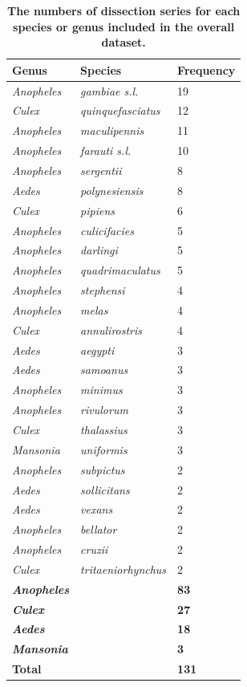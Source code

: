 \documentclass[12pt]{article}
\begin{document}
{\begin{table}[htbp]
	\centering
	\begin{tabular}{lll}
		\toprule
		\textbf{Genus} & \textbf{Species} & \textbf{Frequency} \\
		\midrule
		\textit{Anopheles} & \textit{gambiae s.l.} & 19 \\
		\textit{Culex} & \textit{quinquefasciatus} & 12 \\
		\textit{Anopheles} & \textit{maculipennis} & 11 \\
		\textit{Anopheles} & \textit{farauti s.l.} & 10 \\
		\textit{Anopheles} & \textit{sergentii} & 8 \\
		\textit{Aedes} & \textit{polynesiensis} & 8 \\
		\textit{Culex} & \textit{pipiens} & 6 \\
		\textit{Anopheles} & \textit{culicifacies} & 5 \\
		\textit{Anopheles} & \textit{darlingi} & 5 \\
		\textit{Anopheles} & \textit{quadrimaculatus} & 5 \\
		\textit{Anopheles} & \textit{stephensi} & 4 \\
		\textit{Anopheles} & \textit{melas} & 4 \\
		\textit{Culex} & \textit{annulirostris} & 4 \\
		\textit{Aedes} & \textit{aegypti} & 3 \\
		\textit{Aedes} & \textit{samoanus} & 3 \\
		\textit{Anopheles} & \textit{minimus} & 3 \\
		\textit{Anopheles} & \textit{rivulorum} & 3 \\
		\textit{Culex} & \textit{thalassius} & 3 \\
		\textit{Mansonia} & \textit{uniformis} & 3 \\
		\textit{Anopheles} & \textit{subpictus} & 2 \\
		\textit{Aedes} & \textit{sollicitans} & 2 \\
		\textit{Aedes} & \textit{vexans} & 2 \\
		\textit{Anopheles} & \textit{bellator} & 2 \\
		\textit{Anopheles} & \textit{cruzii} & 2 \\
		\textit{Culex} & \textit{tritaeniorhynchus} & 2 \\
		\bottomrule
		\textit{\textbf{Anopheles}} &       & \textbf{83} \\
		\textit{\textbf{Culex}} &       & \textbf{27} \\
		\textit{\textbf{Aedes}} &       & \textbf{18} \\
		\textit{\textbf{Mansonia}} &       & \textbf{3} \\
		\bottomrule
		\textbf{Total} &  & \textbf{131} \\
	\end{tabular}%
	\caption{\textbf{The numbers of dissection series for each species or genus included in the overall dataset.}}\label{tab:dissection_speciesNumbers}%
\end{table}%


}
\end{document}
